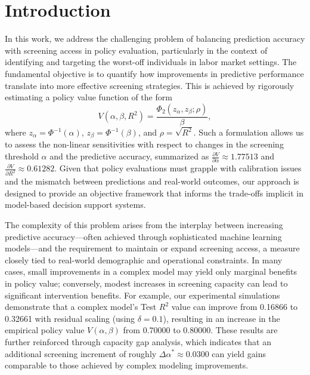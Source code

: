 \documentclass{article}
\begin{document}
\section{Introduction}
In this work, we address the challenging problem of balancing prediction accuracy with screening access in policy evaluation, particularly in the context of identifying and targeting the worst-off individuals in labor market settings. The fundamental objective is to quantify how improvements in predictive performance translate into more effective screening strategies. This is achieved by rigorously estimating a policy value function of the form 
\[
V(\alpha,\beta,R^2)=\frac{\Phi_2(z_\alpha,z_\beta;\rho)}{\beta},
\]
where \( z_\alpha=\Phi^{-1}(\alpha) \), \( z_\beta=\Phi^{-1}(\beta) \), and \(\rho=\sqrt{R^2}\). Such a formulation allows us to assess the non-linear sensitivities with respect to changes in the screening threshold \(\alpha\) and the predictive accuracy, summarized as \(\frac{\partial V}{\partial \alpha}\approx 1.77513\) and \(\frac{\partial V}{\partial R^2}\approx 0.61282\). Given that policy evaluations must grapple with calibration issues and the mismatch between predictions and real-world outcomes, our approach is designed to provide an objective framework that informs the trade-offs implicit in model-based decision support systems.

The complexity of this problem arises from the interplay between increasing predictive accuracy—often achieved through sophisticated machine learning models—and the requirement to maintain or expand screening access, a measure closely tied to real-world demographic and operational constraints. In many cases, small improvements in a complex model may yield only marginal benefits in policy value; conversely, modest increases in screening capacity can lead to significant intervention benefits. For example, our experimental simulations demonstrate that a complex model’s Test \(R^2\) value can improve from 0.16866 to 0.32661 with residual scaling (using \(\delta=0.1\)), resulting in an increase in the empirical policy value \( V(\alpha,\beta) \) from 0.70000 to 0.80000. These results are further reinforced through capacity gap analysis, which indicates that an additional screening increment of roughly \(\Delta\alpha^* \approx 0.0300\) can yield gains comparable to those achieved by complex modeling improvements.
\end{document}
